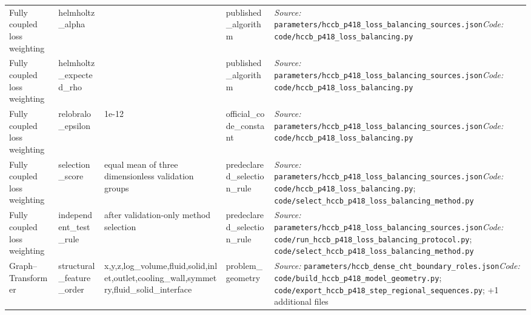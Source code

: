\begin{longtable}{>{\raggedright\arraybackslash}p{2.7cm}>{\raggedright\arraybackslash}p{3.2cm}>{\raggedright\arraybackslash}p{1.5cm}>{\raggedright\arraybackslash}p{2.6cm}>{\raggedright\arraybackslash}p{8.0cm}}
Fully coupled loss weighting & helmholtz\_\allowbreak{}alpha & 0.99 & published\_\allowbreak{}algorithm & \textit{Source:} \nolinkurl{parameters/hccb_p418_loss_balancing_sources.json}\newline \textit{Code:} \nolinkurl{code/hccb_p418_loss_balancing.py} \\
Fully coupled loss weighting & helmholtz\_\allowbreak{}expected\_\allowbreak{}rho & 0.99 & published\_\allowbreak{}algorithm & \textit{Source:} \nolinkurl{parameters/hccb_p418_loss_balancing_sources.json}\newline \textit{Code:} \nolinkurl{code/hccb_p418_loss_balancing.py} \\
Fully coupled loss weighting & relobralo\_\allowbreak{}epsilon & 1e-12 & official\_\allowbreak{}code\_\allowbreak{}constant & \textit{Source:} \nolinkurl{parameters/hccb_p418_loss_balancing_sources.json}\newline \textit{Code:} \nolinkurl{code/hccb_p418_loss_balancing.py} \\
Fully coupled loss weighting & selection\_\allowbreak{}score & equal mean of three dimensionless validation groups & predeclared\_\allowbreak{}selection\_\allowbreak{}rule & \textit{Source:} \nolinkurl{parameters/hccb_p418_loss_balancing_sources.json}\newline \textit{Code:} \nolinkurl{code/hccb_p418_loss_balancing.py}; \nolinkurl{code/select_hccb_p418_loss_balancing_method.py} \\
Fully coupled loss weighting & independent\_\allowbreak{}test\_\allowbreak{}rule & after validation-only method selection & predeclared\_\allowbreak{}selection\_\allowbreak{}rule & \textit{Source:} \nolinkurl{parameters/hccb_p418_loss_balancing_sources.json}\newline \textit{Code:} \nolinkurl{code/run_hccb_p418_loss_balancing_protocol.py}; \nolinkurl{code/select_hccb_p418_loss_balancing_method.py} \\
Graph--Transformer & structural\_\allowbreak{}feature\_\allowbreak{}order & x,\allowbreak{}y,\allowbreak{}z,\allowbreak{}log\_\allowbreak{}volume,\allowbreak{}fluid,\allowbreak{}solid,\allowbreak{}inlet,\allowbreak{}outlet,\allowbreak{}cooling\_\allowbreak{}wall,\allowbreak{}symmetry,\allowbreak{}fluid\_\allowbreak{}solid\_\allowbreak{}interface & problem\_\allowbreak{}geometry & \textit{Source:} \nolinkurl{parameters/hccb_dense_cht_boundary_roles.json}\newline \textit{Code:} \nolinkurl{code/build_hccb_p418_model_geometry.py}; \nolinkurl{code/export_hccb_p418_step_regional_sequences.py}; +1 additional files \\

\end{longtable}
